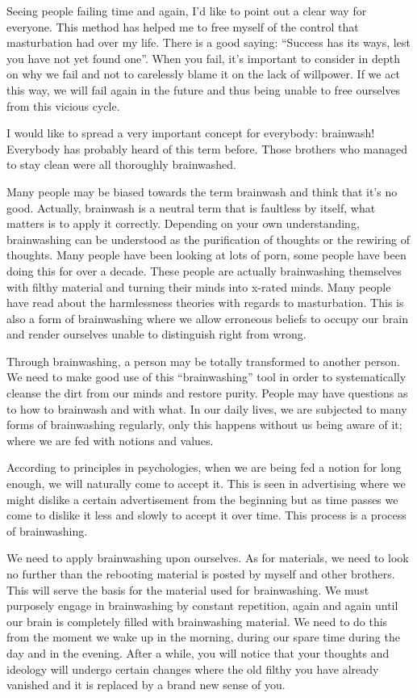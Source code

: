 \documentclass[
]{book}
\begin{document}
Seeing people failing time and again, I'd like to point out a clear way for everyone. This method has helped me to free myself of the control that masturbation had over my life. There is a good saying: ``Success has its ways, lest you have not yet found one''. When you fail, it's important to consider in depth on why we fail and not to carelessly blame it on the lack of willpower. If we act this way, we will fail again in the future and thus being unable to free ourselves from this vicious cycle.

I would like to spread a very important concept for everybody: brainwash! Everybody has probably heard of this term before. Those brothers who managed to stay clean were all thoroughly brainwashed.

Many people may be biased towards the term brainwash and think that it's no good. Actually, brainwash is a neutral term that is faultless by itself, what matters is to apply it correctly. Depending on your own understanding, brainwashing can be understood as the purification of thoughts or the rewiring of thoughts. Many people have been looking at lots of porn, some people have been doing this for over a decade. These people are actually brainwashing themselves with filthy material and turning their minds into x-rated minds. Many people have read about the harmlessness theories with regards to masturbation. This is also a form of brainwashing where we allow erroneous beliefs to occupy our brain and render ourselves unable to distinguish right from wrong.

Through brainwashing, a person may be totally transformed to another person. We need to make good use of this ``brainwashing'' tool in order to systematically cleanse the dirt from our minds and restore purity. People may have questions as to how to brainwash and with what. In our daily lives, we are subjected to many forms of brainwashing regularly, only this happens without us being aware of it; where we are fed with notions and values.

According to principles in psychologies, when we are being fed a notion for long enough, we will naturally come to accept it. This is seen in advertising where we might dislike a certain advertisement from the beginning but as time passes we come to dislike it less and slowly to accept it over time. This process is a process of brainwashing.

We need to apply brainwashing upon ourselves. As for materials, we need to look no further than the rebooting material is posted by myself and other brothers. This will serve the basis for the material used for brainwashing. We must purposely engage in brainwashing by constant repetition, again and again until our brain is completely filled with brainwashing material. We need to do this from the moment we wake up in the morning, during our spare time during the day and in the evening. After a while, you will notice that your thoughts and ideology will undergo certain changes where the old filthy you have already vanished and it is replaced by a brand new sense of you.
\end{document}
